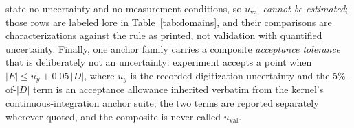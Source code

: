 state no uncertainty and no measurement conditions, so
$u_{\mathrm{val}}$ \emph{cannot be estimated}; those rows are labeled
lore in Table~\ref{tab:domains}, and their comparisons are
characterizations against the rule as printed, not validation with
quantified uncertainty. Finally, one anchor family carries a composite
\emph{acceptance tolerance} that is deliberately not an uncertainty:
experiment  accepts a point when $|E| \le u_y + 0.05\,|D|$,
where $u_y$ is the recorded digitization uncertainty and the
5\%-of-$|D|$ term is an acceptance allowance inherited verbatim from the
kernel's continuous-integration anchor suite; the two terms are reported
separately wherever quoted, and the composite is never called
$u_{\mathrm{val}}$.

